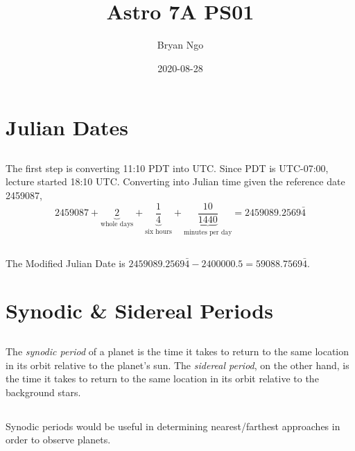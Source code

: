\documentclass{article}
\title{Astro 7A PS01}
\author{Bryan Ngo}
\date{2020-08-28}
\begin{document}
\maketitle

\section{Julian Dates}

\subsection{}

The first step is converting 11:10 PDT into UTC.
Since PDT is UTC-07:00, lecture started 18:10 UTC.
Converting into Julian time given the reference date 2459087,
\begin{equation}
    2459087 + \underbrace{2}_{\text{whole days}} + \underbrace{\frac{1}{4}}_{\text{six hours}} + \underbrace{\frac{10}{1440}}_{\text{minutes per day}} = 2459089.2569\bar{4}
\end{equation}

\subsection{}

The Modified Julian Date is \(2459089.2569\bar{4} - 2400000.5 = 59088.7569\bar{4}\).

\section{Synodic \& Sidereal Periods}

\subsection{}

The \emph{synodic period} of a planet is the time it takes to return to the same location in its orbit relative to the planet's sun.
The \emph{sidereal period}, on the other hand, is the time it takes to return to the same location in its orbit relative to the background stars.

\subsection{}

Synodic periods would be useful in determining nearest/farthest approaches in order to observe planets.
\end{document}
